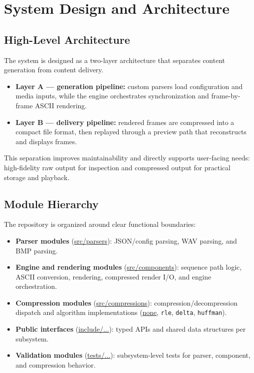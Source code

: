 \section{System Design and Architecture}

\subsection{High-Level Architecture}
The system is designed as a two-layer architecture that separates content generation from content delivery.

\begin{itemize}
    \item \textbf{Layer A — generation pipeline:} custom parsers load configuration and media inputs, while the engine orchestrates synchronization and frame-by-frame ASCII rendering.
    \item \textbf{Layer B — delivery pipeline:} rendered frames are compressed into a compact file format, then replayed through a preview path that reconstructs and displays frames.
\end{itemize}

This separation improves maintainability and directly supports user-facing needs: high-fidelity raw output for inspection and compressed output for practical storage and playback.

\subsection{Module Hierarchy}
The repository is organized around clear functional boundaries:

\begin{itemize}
    \item \textbf{Parser modules} (\url{src/parsers}): JSON/config parsing, WAV parsing, and BMP parsing.
    \item \textbf{Engine and rendering modules} (\url{src/components}): sequence path logic, ASCII conversion, rendering, compressed render I/O, and engine orchestration.
    \item \textbf{Compression modules} (\url{src/compressions}): compression/decompression dispatch and algorithm implementations (\url{none}, \texttt{rle}, \texttt{delta}, \texttt{huffman}).
    \item \textbf{Public interfaces} (\url{include/...}): typed APIs and shared data structures per subsystem.
    \item \textbf{Validation modules} (\url{tests/...}): subsystem-level tests for parser, component, and compression behavior.
\end{itemize}

